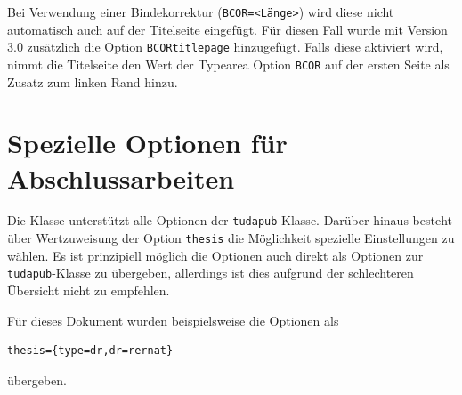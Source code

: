 \documentclass[
	ngerman,%
	accentcolor=9c,%
	ruledheaders=section,%
	class=report,%
	thesis={type=bachelor},%
	fontsize=11pt,%
	parskip=half-,%
	custommargins=true,%
	marginpar=false,%
]{tudapub}
\newcommand*{\file}[1]{\texttt{#1}}
\newcommand*{\code}[1]{\texttt{#1}}
\begin{document}
Bei Verwendung einer Bindekorrektur (\code{BCOR=<Länge>}) wird diese nicht automatisch auch auf der Titelseite eingefügt. Für diesen Fall wurde mit Version 3.0 zusätzlich die Option \code{BCORtitlepage} hinzugefügt. Falls diese aktiviert wird, nimmt die Titelseite den Wert der Typearea Option \code{BCOR} auf der ersten Seite als Zusatz zum linken Rand hinzu.

\section{Spezielle Optionen für Abschlussarbeiten}
Die Klasse unterstützt alle Optionen der \file{tudapub}-Klasse. Darüber hinaus besteht über Wertzuweisung der Option \code{thesis} die Möglichkeit spezielle Einstellungen zu wählen.
Es ist prinzipiell möglich die Optionen auch direkt als Optionen zur \file{tudapub}-Klasse zu übergeben, allerdings ist dies aufgrund der schlechteren Übersicht nicht zu empfehlen.

Für dieses Dokument wurden beispielsweise die Optionen als
\begin{verbatim}
thesis={type=dr,dr=rernat}
\end{verbatim}
übergeben.
\end{document}
